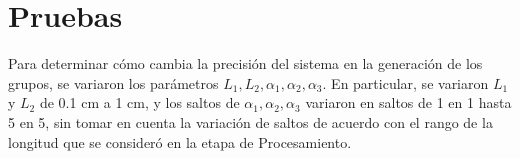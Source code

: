 \section{Pruebas}

Para determinar cómo cambia la precisión del sistema en la generación de los grupos, se variaron los parámetros $L_1, L_2, \alpha_1, \alpha_2, \alpha_3$. En particular, se variaron $L_1$ y $L_2$ de 0.1 cm a 1 cm, y los saltos de $\alpha_1, \alpha_2, \alpha_3$ variaron en saltos de 1 en 1 hasta 5 en 5, sin tomar en cuenta la variación de saltos de acuerdo con el rango de la longitud que se consideró en la etapa de Procesamiento.
